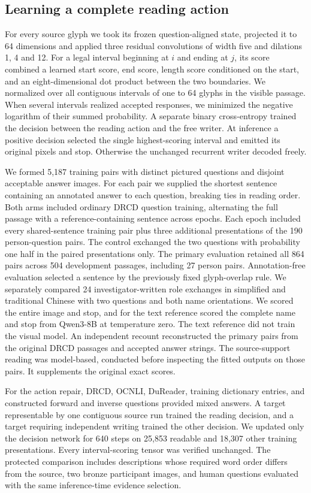 \subsection*{Learning a complete reading action}
For every source glyph we took its frozen question-aligned state, projected it to 64 dimensions and applied three residual convolutions of width five and dilations 1, 4 and 12. For a legal interval beginning at $i$ and ending at $j$, its score combined a learned start score, end score, length score conditioned on the start, and an eight-dimensional dot product between the two boundaries. We normalized over all contiguous intervals of one to 64 glyphs in the visible passage. When several intervals realized accepted responses, we minimized the negative logarithm of their summed probability. A separate binary cross-entropy trained the decision between the reading action and the free writer. At inference a positive decision selected the single highest-scoring interval and emitted its original pixels and stop. Otherwise the unchanged recurrent writer decoded freely.

We formed 5,187 training pairs with distinct pictured questions and disjoint acceptable answer images. For each pair we supplied the shortest sentence containing an annotated answer to each question, breaking ties in reading order. Both arms included ordinary DRCD question training, alternating the full passage with a reference-containing sentence across epochs. Each epoch included every shared-sentence training pair plus three additional presentations of the 190 person-question pairs. The control exchanged the two questions with probability one half in the paired presentations only. The primary evaluation retained all 864 pairs across 504 development passages, including 27 person pairs. Annotation-free evaluation selected a sentence by the previously fixed glyph-overlap rule. We separately compared 24 investigator-written role exchanges in simplified and traditional Chinese with two questions and both name orientations. We scored the entire image and stop, and for the text reference scored the complete name and stop from Qwen3-8B at temperature zero. The text reference did not train the visual model. An independent recount reconstructed the primary pairs from the original DRCD passages and accepted answer strings. The source-support reading was model-based, conducted before inspecting the fitted outputs on those pairs. It supplements the original exact scores.

For the action repair, DRCD, OCNLI, DuReader, training dictionary entries, and constructed forward and inverse questions provided mixed answers. A target representable by one contiguous source run trained the reading decision, and a target requiring independent writing trained the other decision. We updated only the decision network for 640 steps on 25,853 readable and 18,307 other training presentations. Every interval-scoring tensor was verified unchanged. The protected comparison includes descriptions whose required word order differs from the source, two bronze participant images, and human questions evaluated with the same inference-time evidence selection.
